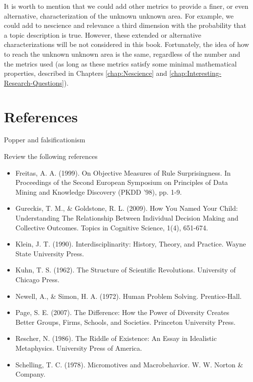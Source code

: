 It is worth to mention that we could add other metrics to provide a finer, or even alternative, characterization of the unknown unknown area. For example, we could add to nescience and relevance a third dimension with the probability that a topic description is true. However, these extended or alternative characterizations will be not considered in this book. Fortunately, the idea of how to reach the unknown unknown area is the same, regardless of the number and the metrics used (as long as these metrics satisfy some minimal mathematical properties, described in Chapters \ref{chap:Nescience} and \ref{chap:Interesting-Research-Questions}).

%
%

\section*{References}

Popper and falsificationism

{\color{red} Review the following references}

\begin{itemize}

\item Freitas, A. A. (1999). On Objective Measures of Rule Surprisingness. In Proceedings of the Second European Symposium on Principles of Data Mining and Knowledge Discovery (PKDD '98), pp. 1-9.

\item Gureckis, T. M., \& Goldstone, R. L. (2009). How You Named Your Child: Understanding The Relationship Between Individual Decision Making and Collective Outcomes. Topics in Cognitive Science, 1(4), 651-674.

\item Klein, J. T. (1990). Interdisciplinarity: History, Theory, and Practice. Wayne State University Press.

\item Kuhn, T. S. (1962). The Structure of Scientific Revolutions. University of Chicago Press.

\item Newell, A., \& Simon, H. A. (1972). Human Problem Solving. Prentice-Hall.

\item Page, S. E. (2007). The Difference: How the Power of Diversity Creates Better Groups, Firms, Schools, and Societies. Princeton University Press.

\item Rescher, N. (1986). The Riddle of Existence: An Essay in Idealistic Metaphysics. University Press of America.

\item Schelling, T. C. (1978). Micromotives and Macrobehavior. W. W. Norton \& Company.

\end{itemize}
